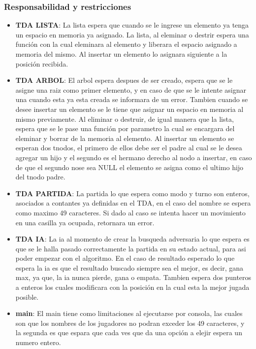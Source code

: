 \documentclass[12pt,twocolum,a4paper]{article}
\begin{document}
\subsubsection{Responsabilidad y restricciones}
\begin{itemize}
    \item {\bf TDA LISTA}: La lista espera que cuando se le ingrese un elemento ya tenga un espacio en memoria ya asignado. La lista, al eleminar o destrir espera una funci\'on con la cual eleminara al elemento y liberara el espacio asignado a memoria del mismo. Al insertar un elemento lo asignara siguiente a la posici\'on recibida.
    \item {\bf TDA ARBOL}: El arbol espera despues de ser creado, espera que se le asigne una raiz como primer elemento, y en caso de que se le intente asignar una cuando esta ya esta creada se informara de un error. Tambien cuando se desee insertar un elemento se le tiene que asignar un espacio en memoria al mismo previamente. Al eliminar o destruir, de igual manera que la lista, espera que se le pase una funci\'on por parametro la cual se encargara del eleminar y borrar de la memoria al elemento. Al insertar un elemento se esperan dos tnodos, el primero de ellos debe ser el padre al cual se le desea agregar un hijo y el segundo es el hermano derecho al nodo a insertar, en caso de que el segundo nose sea NULL el elemento se asigna como el ultimo hijo del tnodo padre.
    \item {\bf TDA PARTIDA}: La partida lo que espera como modo y turno son enteros, asociados a contantes ya definidas en el TDA, en el caso del nombre se espera como maximo 49 caracteres. Si dado al caso se intenta hacer un movimiento en una casilla ya ocupada, retornara un error.
    \item {\bf TDA IA}: La ia al momento de crear la busqueda adversaria lo que espera es que se le halla pasado correctamente la partida en su estado actual, para asi poder empezar con el algoritmo. En el caso de resultado esperado lo que espera la ia es que el resultado buscado siempre sea el mejor, es decir, gana max, ya que, la ia nunca pierde, gana o empata. Tambien espera dos punteros a enteros los cuales modificara con la posici\'on en la cual esta la mejor jugada posible.
    \item {\bf main}: El main tiene como limitaciones al ejecutarse por consola, las cuales son que los nombres de los jugadores no podran exceder los 49 caracteres, y la segunda es que espara que cada ves que da una opci\'on a elejir espera un numero entero.
\end{itemize}
\end{document}
